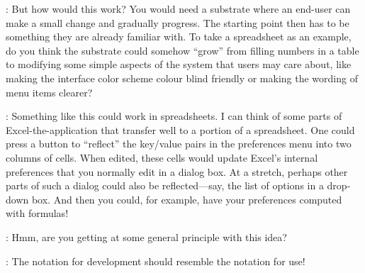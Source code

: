 \documentclass[runningheads]{llncs}
\newcommand{\T}{Tomas}
\newcommand{\J}{Joel}
\newcommand{\says}[2][gg]{\vspace{0.5em}\noindent\hangindent=0.5cm{\textsc{#1}}: #2}
\begin{document}
\says[\T]{But how would this work? You would need a substrate where an end-user can make a small change and gradually progress. The starting point then has to be something they are already familiar with. To take a spreadsheet as an example, do you think the substrate could somehow ``grow'' from filling numbers in a table to modifying some simple aspects of the system that users may care about, like making the interface color scheme colour blind friendly or making the wording of menu items clearer?}

\says[\J]{Something like this could work in spreadsheets. I can think of some parts of Excel-the-application that transfer well to a portion of a spreadsheet. One could press a button to ``reflect'' the key/value pairs in the preferences menu into two columns of cells. When edited, these cells would update Excel's internal preferences that you normally edit in a dialog box. At a stretch, perhaps other parts of such a dialog could also be reflected---say, the list of options in a drop-down box. And then you could, for example, have your preferences computed with formulas!}

\says[\T]{Hmm, are you getting at some general principle with this idea?}

\says[\J]{The notation for development should resemble the notation for use!}
\end{document}
